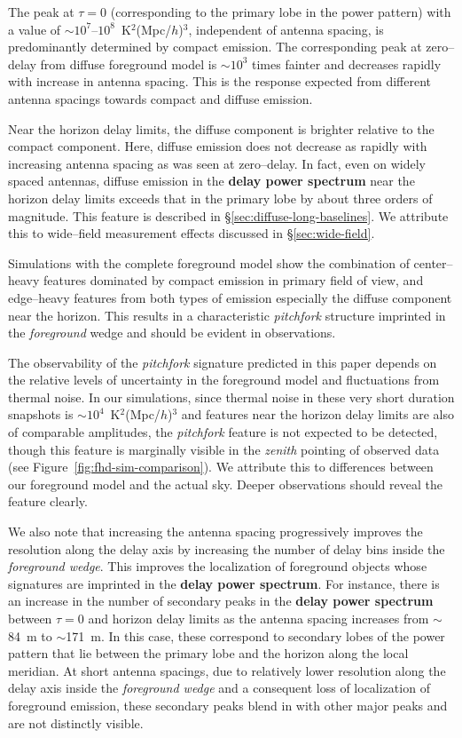 \documentclass[preprint2,iop,numberedappendix,twocolappendix,appendixfloats]{emulateapj}
\begin{document}
The peak at $\tau=0$ (corresponding to the primary lobe in the power pattern) with a value of $\sim 10^7$--$10^8$~K$^2$(Mpc/$h$)$^3$, independent of antenna spacing, is predominantly determined by compact emission. The corresponding peak at zero--delay from diffuse foreground model is $\sim 10^3$ times fainter and decreases rapidly with increase in antenna spacing. This is the response expected from different antenna spacings towards compact and diffuse emission. 

Near the horizon delay limits, the diffuse component is brighter relative to the compact component. Here, diffuse emission does not decrease as rapidly with increasing antenna spacing as was seen at zero--delay. In fact, even on widely spaced antennas, diffuse emission in the {\bf delay power spectrum} near the horizon delay limits exceeds that in the primary lobe by about three orders of magnitude. This feature is described in \S\ref{sec:diffuse-long-baselines}. We attribute this to wide--field measurement effects discussed in \S\ref{sec:wide-field}. 

Simulations with the complete foreground model show the combination of center--heavy features dominated by compact emission in primary field of view, and edge--heavy features from both types of emission especially the diffuse component near the horizon. This results in a characteristic {\it pitchfork} structure imprinted in the {\it foreground} wedge and should be evident in observations.

The observability of the {\it pitchfork} signature predicted in this paper depends on the relative levels of uncertainty in the foreground model and fluctuations from thermal noise. In our simulations, since thermal noise in these very short duration snapshots is $\sim 10^4$~K$^2$(Mpc/$h$)$^3$ and features near the horizon delay limits are also of comparable amplitudes, the {\it pitchfork} feature is not expected to be detected, though this feature is marginally visible in the {\it zenith} pointing of observed data (see Figure~\ref{fig:fhd-sim-comparison}). We attribute this to differences between our foreground model and the actual sky.  Deeper observations should reveal the feature clearly.

We also note that increasing the antenna spacing progressively improves the resolution along the delay axis by increasing the number of delay bins inside the {\it foreground wedge}. This improves the localization of foreground objects whose signatures are imprinted in the {\bf delay power spectrum}. For instance, there is an increase in the number of secondary peaks in the {\bf delay power spectrum} between $\tau=0$ and horizon delay limits as the antenna spacing increases from $\sim$84~m to $\sim$171~m. In this case, these correspond to secondary lobes of the power pattern that lie between the primary lobe and the horizon along the local meridian. At short antenna spacings, due to relatively lower resolution along the delay axis inside the {\it foreground wedge} and a consequent loss of localization of foreground emission, these secondary peaks blend in with other major peaks and are not distinctly visible. 
\end{document}
